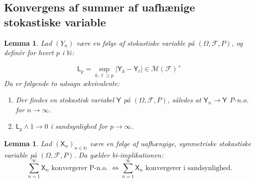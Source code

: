 \documentclass{article}
\newcommand{\1}{\mathbbm{1}}
\newcommand{\Y}{\mathsf{Y}}
\newtheorem{lemma}[theorem]{Lemma}
\theoremstyle{boxed}
\begin{document}
\subsection{Konvergens af summer af uafhænige stokastiske variable}
\begin{theorem-box}
    \begin{lemma}
        Lad $\left(Y_n\right)$ være en følge af stokastiske variable på $(\Omega, \mathcal{F}, P)$, og definér for hvert $p$ i $\mathbb{N}$:

$$
\mathsf{L}_p=\sup _{k, \ell \geq p}\left|\mathsf{Y}_k-\mathsf{Y}_{\ell}\right| \in \overline{\mathcal{M}}(\mathcal{F})^{+}
$$
Da er følgende to udsagn ækvivalente:
\begin{enumerate}
    \item[\textnormal{(i)}] Der findes en stokastisk variabel $\Y$ på $(\Omega, \mathcal{F}, P)$, således at $\mathsf{Y}_n \rightarrow \mathsf{Y}$ P-n.o. for $n \rightarrow \infty$.
    \item[\textnormal{(ii)}] $\mathsf{L}_p \wedge 1 \rightarrow 0$ i sandsynlighed for $p \rightarrow \infty$.
\end{enumerate}
    \end{lemma}
\end{theorem-box}
\begin{theorem-box}
    \begin{lemma}
        Lad $\left(\mathsf{X}_n\right)_{n \in \mathbb{N}}$ være en følge af uafhængige, symmetriske stokastiske variable på $(\Omega, \mathcal{F}, P)$. Da gælder bi-implikationen:
$$\sum_{n=1}^{\infty} \mathsf{X}_n \text{ konvergerer P-n.o. } \Longleftrightarrow \sum_{n=1}^{\infty} \mathsf{X}_n \text{ konvergerer i sandsynlighed.}$$
    \end{lemma}
\end{theorem-box}
\end{document}
